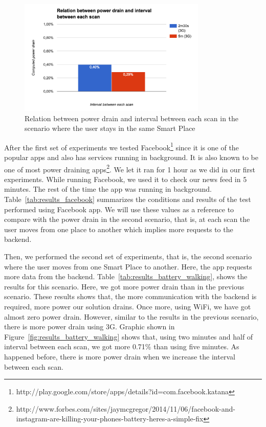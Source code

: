 
\begin{figure}[!ht]
  \centering
    \includegraphics[width=0.8\textwidth, keepaspectratio]{images/results_battery_stopped}
    \caption[Power drain when the user does not move]{Relation between power drain and interval between each scan in the scenario where the user stays in the same Smart Place}
    \label{fig:results_battery_stopped}
\end{figure}

After the first set of experiments we tested Facebook\footnote{http://play.google.com/store/apps/details?id=com.facebook.katana} since it is one of the popular apps and also has services running in background.
It is also known to be one of most power draining apps\footnote{http://www.forbes.com/sites/jaymcgregor/2014/11/06/facebook-and-instagram-are-killing-your-phones-battery-heres-a-simple-fix}.
We let it ran for 1 hour as we did in our first experiments.
While running Facebook, we used it to check our news feed in 5 minutes. The rest of the time the app was running in background.
Table~\ref{tab:results_facebook} summarizes the conditions and results of the test performed using Facebook app.
We will use these values as a reference to compare with the power drain in the second scenario, that is, at each scan the user moves from one place to another which implies more requests to the backend.


Then, we performed the second set of experiments, that is, the second scenario where the user moves from one Smart Place to another.
Here, the app requests more data from the backend.
Table~\ref{tab:results_battery_walking}, shows the results for this scenario. Here, we got more power drain than in the previous scenario.
These results shows that, the more communication with the backend is required, more power our solution drains.
Once more, using \gls{WiFi}, we have got almost zero power drain.
However, similar to the results in the previous scenario, there is more power drain using \gls{3G}.
Graphic shown in Figure~\ref{fig:results_battery_walking} shows that, using two minutes and half of interval between each scan, we got more 0.71\% than using five minutes.
As happened before, there is more power drain when we increase the interval between each scan.

